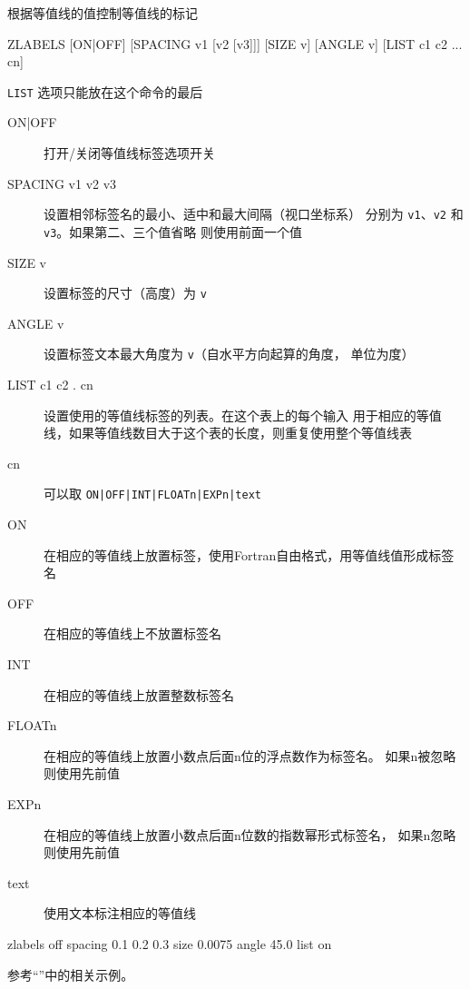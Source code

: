 \label{cmd:zlabels}

根据等值线的值控制等值线的标记

\begin{SACSTX}
ZLABELS [ON|OFF] [SPACING v1 [v2 [v3]]] [SIZE v]
    [ANGLE v] [LIST c1 c2 ... cn]
\end{SACSTX}
\texttt{LIST} 选项只能放在这个命令的最后

\begin{description}
\item [ON|OFF] 打开/关闭等值线标签选项开关
\item [SPACING v1 v2 v3] 设置相邻标签名的最小、适中和最大间隔（视口坐标系）
    分别为 \texttt{v1}、\texttt{v2} 和 \texttt{v3}。如果第二、三个值省略
    则使用前面一个值
\item [SIZE v] 设置标签的尺寸（高度）为 \texttt{v}
\item [ANGLE v] 设置标签文本最大角度为 \texttt{v}（自水平方向起算的角度，
    单位为度）
\item [LIST c1 c2 . cn] 设置使用的等值线标签的列表。在这个表上的每个输入
    用于相应的等值线，如果等值线数目大于这个表的长度，则重复使用整个等值线表
\item [cn]  可以取 \texttt{ON|OFF|INT|FLOATn|EXPn|text}
\item [ON] 在相应的等值线上放置标签，使用Fortran自由格式，用等值线值形成标签名
\item [OFF] 在相应的等值线上不放置标签名
\item [INT] 在相应的等值线上放置整数标签名
\item [FLOATn] 在相应的等值线上放置小数点后面n位的浮点数作为标签名。
    如果n被忽略则使用先前值
\item [EXPn] 在相应的等值线上放置小数点后面n位数的指数幂形式标签名，
    如果n忽略则使用先前值
\item [text] 使用文本标注相应的等值线
\end{description}

\begin{SACDFT}
zlabels off spacing 0.1 0.2 0.3 size 0.0075 angle 45.0 list on
\end{SACDFT}

参考``''中的相关示例。
